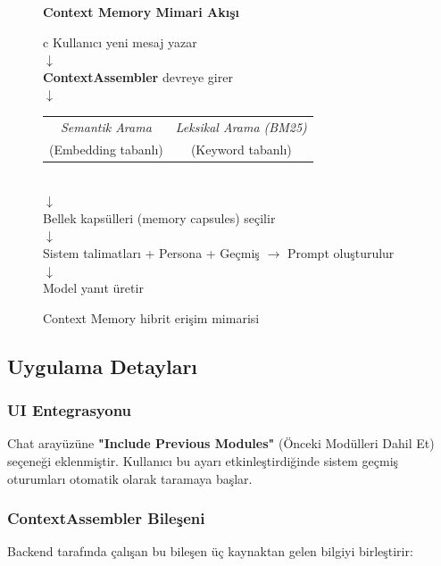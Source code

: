 \documentclass[12pt,a4paper]{article}
\begin{document}
\begin{figure}[H]
\centering
\begin{tcolorbox}[colback=headerbg, colframe=codeblue!40, width=\textwidth]
\centering
\small
\textbf{Context Memory Mimari Akışı}\\[1em]
\begin{tabular}{c}
Kullanıcı yeni mesaj yazar \\
$\downarrow$ \\
\textbf{ContextAssembler} devreye girer \\
$\downarrow$ \\
\begin{tabular}{cc}
\textit{Semantik Arama} & \textit{Leksikal Arama (BM25)} \\
(Embedding tabanlı) & (Keyword tabanlı) \\
\end{tabular} \\
$\downarrow$ \\
Bellek kapsülleri (memory capsules) seçilir \\
$\downarrow$ \\
Sistem talimatları + Persona + Geçmiş $\rightarrow$ Prompt oluşturulur \\
$\downarrow$ \\
Model yanıt üretir \\
\end{tabular}
\end{tcolorbox}
\caption{Context Memory hibrit erişim mimarisi}
\end{figure}

\subsection{Uygulama Detayları}

\subsubsection{UI Entegrasyonu}
Chat arayüzüne \textbf{"Include Previous Modules"} (Önceki Modülleri Dahil Et) seçeneği eklenmiştir. Kullanıcı bu ayarı etkinleştirdiğinde sistem geçmiş oturumları otomatik olarak taramaya başlar.

\subsubsection{ContextAssembler Bileşeni}
Backend tarafında çalışan bu bileşen üç kaynaktan gelen bilgiyi birleştirir:
\end{document}
